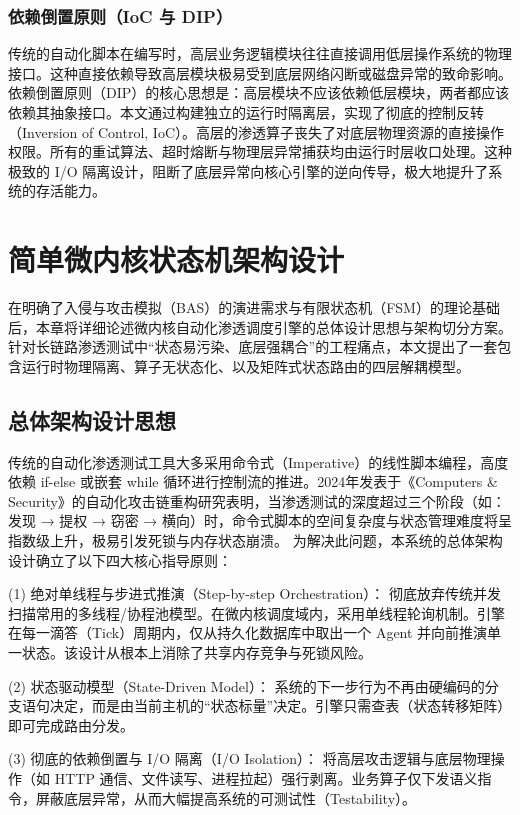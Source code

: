 \documentclass[twoside,openright]{xduugthesis}
\begin{document}
\subsection{依赖倒置原则（IoC 与 DIP）}
传统的自动化脚本在编写时，高层业务逻辑模块往往直接调用低层操作系统的物理接口。这种直接依赖导致高层模块极易受到底层网络闪断或磁盘异常的致命影响。
依赖倒置原则（DIP）的核心思想是：高层模块不应该依赖低层模块，两者都应该依赖其抽象接口\cite{martin2017clean}。本文通过构建独立的运行时隔离层，实现了彻底的控制反转（Inversion of Control, IoC）。高层的渗透算子丧失了对底层物理资源的直接操作权限。所有的重试算法、超时熔断与物理层异常捕获均由运行时层收口处理。这种极致的 I/O 隔离设计，阻断了底层异常向核心引擎的逆向传导，极大地提升了系统的存活能力。

\chapter{简单微内核状态机架构设计}

在明确了入侵与攻击模拟（BAS）的演进需求与有限状态机（FSM）的理论基础后，本章将详细论述微内核自动化渗透调度引擎的总体设计思想与架构切分方案。针对长链路渗透测试中“状态易污染、底层强耦合”的工程痛点，本文提出了一套包含运行时物理隔离、算子无状态化、以及矩阵式状态路由的四层解耦模型。

\section{总体架构设计思想}

传统的自动化渗透测试工具大多采用命令式（Imperative）的线性脚本编程，高度依赖 if-else 或嵌套 while 循环进行控制流的推进。2024年发表于《Computers & Security》的自动化攻击链重构研究表明，当渗透测试的深度超过三个阶段（如：发现 → 提权 → 窃密 → 横向）时，命令式脚本的空间复杂度与状态管理难度将呈指数级上升，极易引发死锁与内存状态崩溃\cite{li2024statedriven}。
为解决此问题，本系统的总体架构设计确立了以下四大核心指导原则：

(1) 绝对单线程与步进式推演（Step-by-step Orchestration）： 彻底放弃传统并发扫描常用的多线程/协程池模型。在微内核调度域内，采用单线程轮询机制。引擎在每一滴答（Tick）周期内，仅从持久化数据库中取出一个 Agent 并向前推演单一状态。该设计从根本上消除了共享内存竞争与死锁风险。

(2) 状态驱动模型（State-Driven Model）： 系统的下一步行为不再由硬编码的分支语句决定，而是由当前主机的“状态标量”决定。引擎只需查表（状态转移矩阵）即可完成路由分发。

(3) 彻底的依赖倒置与 I/O 隔离（I/O Isolation）： 将高层攻击逻辑与底层物理操作（如 HTTP 通信、文件读写、进程拉起）强行剥离。业务算子仅下发语义指令，屏蔽底层异常，从而大幅提高系统的可测试性（Testability）。
\end{document}
